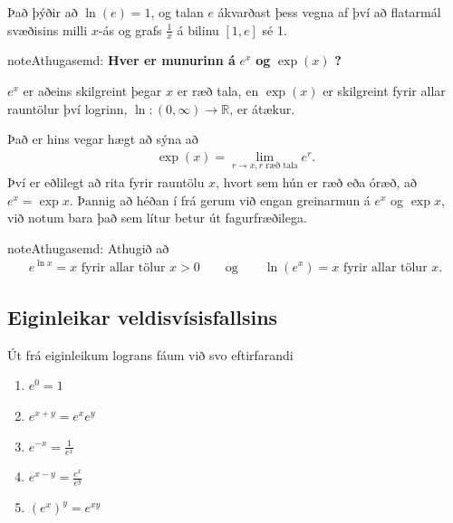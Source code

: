 \documentclass[b5paper,11pt,icelandic]{sphinxmanual}
\begin{document}
Það þýðir að \(\ln(e)=1\), og talan \(e\) ákvarðast þess vegna
af því að flatarmál svæðisins milli \(x\)-ás og grafs
\(\frac 1x\) á bilinu \([1,e]\) sé 1.


\begin{notice}{note}{Athugasemd:}
\textbf{Hver er munurinn á} \(e^x\) \textbf{og} \(\exp(x)\) \textbf{?}

\(e^x\) er aðeins skilgreint þegar \(x\) er ræð tala, en
\(\exp(x)\) er skilgreint fyrir allar rauntölur því logrinn,
\(\ln:(0,\infty)\to {{\mathbb  R}}\), er átækur.

Það er hins vegar hægt að sýna að
\begin{equation*}
\begin{split}\exp(x)=\lim_{r\to x, r\text{ ræð tala}} e^r.\end{split}
\end{equation*}
Því er eðlilegt að rita fyrir rauntölu \(x\), hvort sem hún er ræð
eða óræð, að \(e^x=\exp x\). Þannig að héðan í frá gerum við engan
greinarmun á \(e^x\) og \(\exp x\), við notum bara það sem lítur
betur út fagurfræðilega.
\end{notice}

\begin{notice}{note}{Athugasemd:}
Athugið að
\begin{equation*}
\begin{split}e^{\ln x}=x \mbox{ fyrir allar tölur }x>0\qquad \mbox{og}
\qquad \ln(e^x)=x  \mbox{ fyrir allar tölur }x.\end{split}
\end{equation*}\end{notice}


\subsection{Eiginleikar veldisvísisfallsins}
\label{kafli04:eiginleikar-veldisvisisfallsins}
Út frá eiginleikum lograns fáum við svo eftirfarandi
\begin{enumerate}
\item {} 
\(e^0=1\)

\item {} 
\(e^{x+y}=e^x e^y\)

\item {} 
\(e^{-x}=\frac{1}{e^x}\)

\item {} 
\(e^{x-y}=\frac{e^x}{e^y}\)

\item {} 
\(\left(e^x\right)^y=e^{xy}\)

\end{enumerate}
\end{document}
